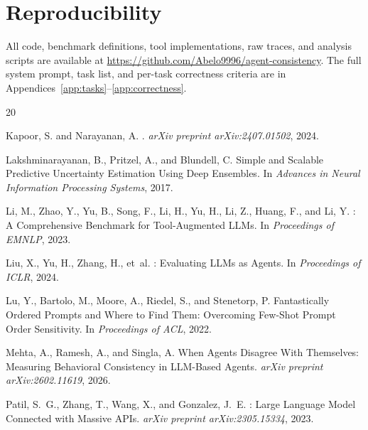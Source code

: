 \documentclass[letterpaper]{article}
\begin{document}

\section*{Reproducibility}
All code, benchmark definitions, tool implementations, raw traces, and analysis
scripts are available at \url{https://github.com/Abelo9996/agent-consistency}.
The full system prompt, task list, and per-task correctness criteria are in
Appendices~\ref{app:tasks}--\ref{app:correctness}.

\begin{thebibliography}{20}

Kapoor, S. and Narayanan, A.
.
\newblock \textit{arXiv preprint arXiv:2407.01502}, 2024.

Lakshminarayanan, B., Pritzel, A., and Blundell, C.
\newblock Simple and Scalable Predictive Uncertainty Estimation Using Deep
  Ensembles.
\newblock In \textit{Advances in Neural Information Processing Systems}, 2017.

Li, M., Zhao, Y., Yu, B., Song, F., Li, H., Yu, H., Li, Z., Huang, F., and
  Li, Y.
: A Comprehensive Benchmark for Tool-Augmented {LLMs}.
\newblock In \textit{Proceedings of EMNLP}, 2023.

Liu, X., Yu, H., Zhang, H., et~al.
: Evaluating {LLMs} as Agents.
\newblock In \textit{Proceedings of ICLR}, 2024.

Lu, Y., Bartolo, M., Moore, A., Riedel, S., and Stenetorp, P.
\newblock Fantastically Ordered Prompts and Where to Find Them: Overcoming
  Few-Shot Prompt Order Sensitivity.
\newblock In \textit{Proceedings of ACL}, 2022.

Mehta, A., Ramesh, A., and Singla, A.
\newblock When Agents Disagree With Themselves: Measuring Behavioral
  Consistency in {LLM}-Based Agents.
\newblock \textit{arXiv preprint arXiv:2602.11619}, 2026.

Patil, S.~G., Zhang, T., Wang, X., and Gonzalez, J.~E.
: Large Language Model Connected with Massive {APIs}.
\newblock \textit{arXiv preprint arXiv:2305.15334}, 2023.


\end{thebibliography}
\end{document}
